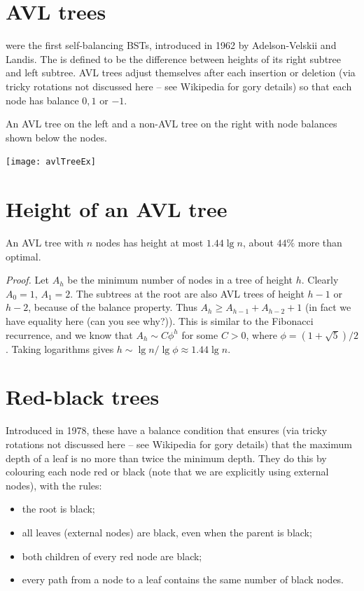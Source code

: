 \section{AVL trees}
 were the first self-balancing BSTs, introduced in 1962 by Adelson-Velskii and Landis. 
The  is defined to be the difference between heights of its 
right subtree and left subtree. 
AVL trees adjust themselves after each insertion or deletion (via tricky rotations not discussed here -- see Wikipedia for gory details) 
so that each node has balance $0, 1$ or $-1$.

\begin{Boxample} \label{ex:avlTreeEx}
An AVL tree on the left and a non-AVL tree on the right with node balances shown below the nodes.
\begin{center}
  \texttt{[image: avlTreeEx]}
\end{center}
\end{Boxample}

\section{Height of an AVL tree}
\begin{Boxample}
An AVL tree with $n$ nodes has height at most $1.44 \lg n$, about $44\%$ more 
than optimal.

\textit{Proof.} Let $A_h$ be the minimum number of nodes in a tree of height $h$. 
Clearly $A_0 = 1$, $A_1 = 2$. 
The subtrees at the root are also AVL trees of height $h-1$ or $h-2$, because of the balance property. 
Thus $A_h \geq A_{h-1} + A_{h-2} + 1$ (in fact we have equality here (can you see why?)). 
This is similar to the Fibonacci recurrence, and we know that 
$A_h \sim C \phi^h$ for some $C>0$, where $\phi = (1+\sqrt{5})/2$. 
Taking logarithms gives $h \sim \lg n / \lg \phi \approx 1.44 \lg n$. 
\end{Boxample}

\section{Red-black trees}
Introduced in 1978, these have a balance condition that ensures (via tricky rotations not discussed here -- see Wikipedia for gory details) 
that the maximum depth of a leaf is no more than twice the minimum depth. 
They do this by colouring each node red or black (note that we are explicitly using external nodes), with the rules:
\begin{itemize}
\item the root is black;
\item all leaves (external nodes) are black, even when the parent is black;
\item both children of every red node are black;
\item every path from a node to a leaf contains the same number of black nodes.
\end{itemize}

